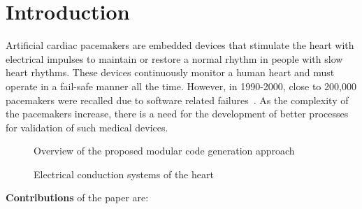 \section{Introduction}

Artificial cardiac pacemakers are embedded devices that 
stimulate the heart with electrical impulses to 
maintain or restore a normal rhythm in people with slow heart rhythms.
These devices continuously monitor a human heart and must operate in a 
fail-safe manner all the time. 
However, in 1990-2000, close to 200,000 pacemakers were 
recalled due to software related failures~\cite{alemzadeh13}.
As the complexity of the pacemakers increase, there is a need for the
development of better processes for validation of such
medical devices.




\begin{figure}[bthp]
  \centering \scalebox{0.7}{  }
  \caption{Overview of the proposed modular code generation
    approach \label{fig:overview}}
\end{figure}

\begin{figure*}[hbpt]
  \centering 
  \caption{Electrical conduction systems of the heart}
  \label{fig:heartOverview}
\end{figure*}

\textbf{Contributions} of the paper are:  



